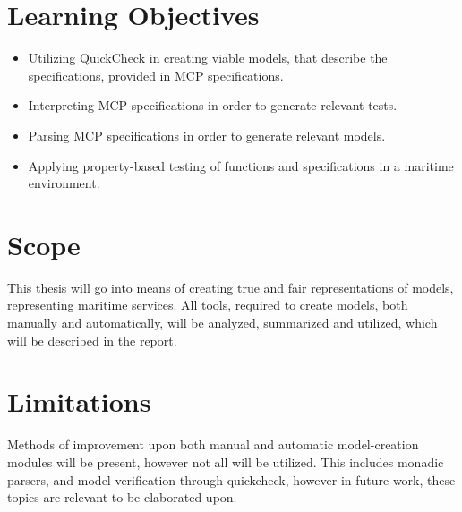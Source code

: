 \section{Learning Objectives}

\begin{itemize}
	\item Utilizing QuickCheck in creating viable models, that describe the specifications, provided in MCP specifications.
	\item Interpreting MCP specifications in order to generate relevant tests.
	\item Parsing MCP specifications in order to generate relevant models.
	\item Applying property-based testing of functions and specifications in a maritime environment.
\end{itemize}

\section{Scope}
This thesis will go into means of creating true and fair representations of models, representing maritime services. All tools, required to create models, both manually and automatically, will be analyzed, summarized and utilized, which will be described in the report.

\section{Limitations}
Methods of improvement upon both manual and automatic model-creation modules will be present, however not all will be utilized. This includes monadic parsers, and model verification through quickcheck, however in future work, these topics are relevant to be elaborated upon.

